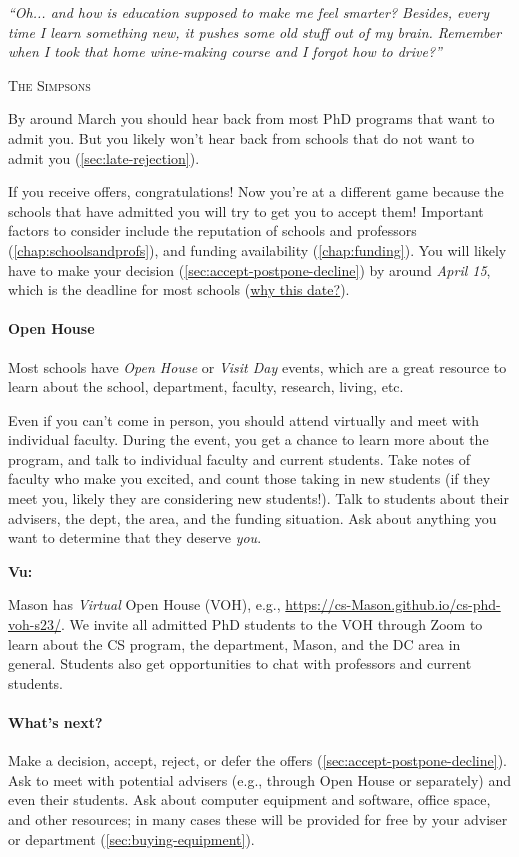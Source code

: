 \documentclass[oneside,11pt,dvipsnames]{book}
\newcommand{\myepigraphsimpsons}[1]{
\epigraph{\vspace{-0.2in} \emph{#1}}{\textsc{The Simpsons}}
}
\newenvironment{commentbox}[1][]{
  \small
  \begin{mybox}
    {\small \textbf{#1}}
  }{
  \end{mybox}
}
\begin{document}
\myepigraphsimpsons{``Oh... and how is education supposed to make me feel smarter? Besides, every time I learn something new, it pushes some old stuff out of my brain. Remember when I took that home wine-making course and I forgot how to drive?''}

By around March you should hear back from most PhD programs that want to admit you. 
But you likely won't hear back from schools that do not want to admit you (\autoref{sec:late-rejection}).

If you receive offers, congratulations!  Now you're at a different game because the schools that have admitted you will try to get you to accept them!  Important factors to consider include the reputation of schools and professors (\autoref{chap:schoolsandprofs}), and funding availability (\autoref{chap:funding}). You will likely have to make your decision (\autoref{sec:accept-postpone-decline}) by around \emph{April 15}, which is the deadline for most schools
(\href{https://cgsnet.org/wp-content/uploads/2024/01/CGS_April15_Resolution_Jan312024.pdf}{why this date?}).

\paragraph{Open House} Most schools have \emph{Open House} or \emph{Visit Day} events, which are a great resource to learn about the school, department, faculty, research, living, etc.

Even if you can't come in person, you should attend virtually and meet with individual faculty. During the event, you get a chance to learn more about the program, and talk to individual faculty and current students.  Take notes of faculty who make you excited, and count those taking in new students (if they meet you, likely they are considering new students!).  Talk to students about their advisers, the dept, the area, and the funding situation.  Ask about anything you want to determine that they deserve \emph{you}.

\begin{commentbox}[Vu:]
  Mason has \emph{Virtual} Open House (VOH), e.g., \url{https://cs-Mason.github.io/cs-phd-voh-s23/}. We invite all admitted PhD students to the VOH through Zoom to learn about the CS program, the department, Mason, and the DC area in general. Students also get opportunities to chat with professors and current students.
\end{commentbox}

\paragraph{What's next?} Make a decision, accept, reject, or defer the offers  (\autoref{sec:accept-postpone-decline}). Ask to meet with potential advisers (e.g., through Open House or separately) and even their students. Ask about computer equipment and software, office space, and other resources; in many cases these will be provided for free by your adviser or department (\autoref{sec:buying-equipment}).
\end{document}
